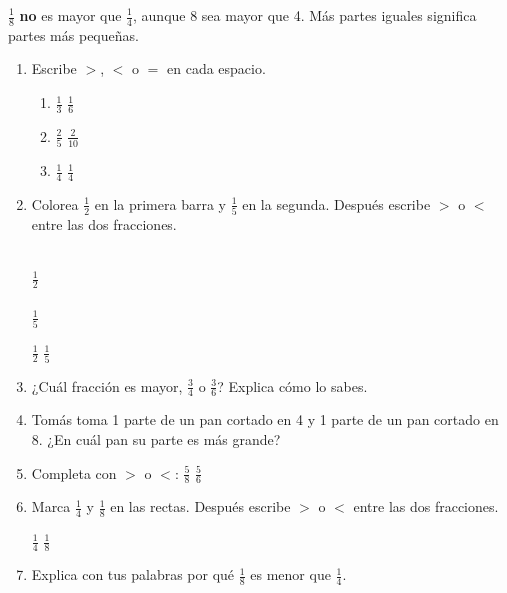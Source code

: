 \begin{wbtip}
$\frac{1}{8}$ \textbf{no} es mayor que $\frac{1}{4}$, aunque 8 sea mayor que 4. Más partes iguales significa partes más pequeñas.
\end{wbtip}

\begin{wbpractice}
\begin{enumerate}
\item Escribe $>$, $<$ o $=$ en cada espacio.
  \begin{enumerate}
  \item $\frac{1}{3}$ \wbblank[1.5cm] $\frac{1}{6}$
  \item $\frac{2}{5}$ \wbblank[1.5cm] $\frac{2}{10}$
  \item $\frac{1}{4}$ \wbblank[1.5cm] $\frac{1}{4}$
  \end{enumerate}

\item Colorea $\frac{1}{2}$ en la primera barra y $\frac{1}{5}$ en la segunda. Después escribe $>$ o $<$ entre las dos fracciones.

\begin{center}
\\[1mm]
$\frac{1}{2}$\\[3mm]
\\[1mm]
$\frac{1}{5}$
\end{center}

$\frac{1}{2}$ \wbblank[1.5cm] $\frac{1}{5}$

\item ¿Cuál fracción es mayor, $\frac{3}{4}$ o $\frac{3}{6}$? Explica cómo lo sabes.

\item Tomás toma 1 parte de un pan cortado en 4 y 1 parte de un pan cortado en 8. ¿En cuál pan su parte es más grande?

\item Completa con $>$ o $<$: $\frac{5}{8}$ \wbblank[1.5cm] $\frac{5}{6}$

\item Marca $\frac{1}{4}$ y $\frac{1}{8}$ en las rectas. Después escribe $>$ o $<$ entre las dos fracciones.


$\frac{1}{4}$ \wbblank[1.5cm] $\frac{1}{8}$

\item Explica con tus palabras por qué $\frac{1}{8}$ es menor que $\frac{1}{4}$.
\end{enumerate}
\end{wbpractice}

